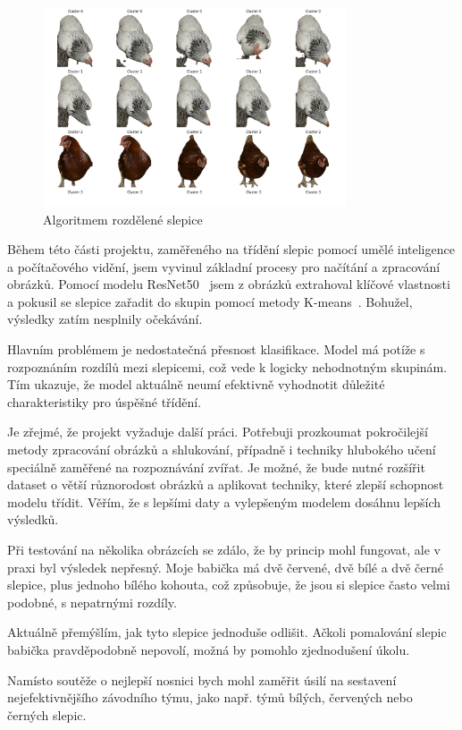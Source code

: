 \begin{figure}[H]
    \centering
    \includegraphics[width=0.8\textwidth]{img/chicks_in_clusters_2}
    \caption{Algoritmem rozdělené slepice}
    \label{fig:chicks_in_clusters_2}
\end{figure}

Během této části projektu, zaměřeného na třídění slepic pomocí umělé inteligence a počítačového vidění, jsem vyvinul základní procesy pro načítání a zpracování obrázků.
Pomocí modelu ResNet50~\cite{ResNet50Documentation} jsem z obrázků extrahoval klíčové vlastnosti a pokusil se slepice zařadit do skupin pomocí metody K-means~\cite{scikit-learnKMeans}.
Bohužel, výsledky zatím nesplnily očekávání.

Hlavním problémem je nedostatečná přesnost klasifikace.
Model má potíže s rozpoznáním rozdílů mezi slepicemi, což vede k logicky nehodnotným skupinám.
Tím ukazuje, že model aktuálně neumí efektivně vyhodnotit důležité charakteristiky pro úspěšné třídění.

Je zřejmé, že projekt vyžaduje další práci.
Potřebuji prozkoumat pokročilejší metody zpracování obrázků a shlukování, případně i techniky hlubokého učení speciálně zaměřené na rozpoznávání zvířat.
Je možné, že bude nutné rozšířit dataset o větší různorodost obrázků a aplikovat techniky, které zlepší schopnost modelu třídit.
Věřím, že s lepšími daty a vylepšeným modelem dosáhnu lepších výsledků.

Při testování na několika obrázcích se zdálo, že by princip mohl fungovat, ale v praxi byl výsledek nepřesný.
Moje babička má dvě červené, dvě bílé a dvě černé slepice, plus jednoho bílého kohouta, což způsobuje, že jsou si slepice často velmi podobné, s nepatrnými rozdíly.

Aktuálně přemýšlím, jak tyto slepice jednoduše odlišit.
Ačkoli pomalování slepic babička pravděpodobně nepovolí, možná by pomohlo zjednodušení úkolu.

Namísto soutěže o nejlepší nosnici bych mohl zaměřit úsilí na sestavení nejefektivnějšího závodního týmu, jako např. týmů bílých, červených nebo černých slepic.





